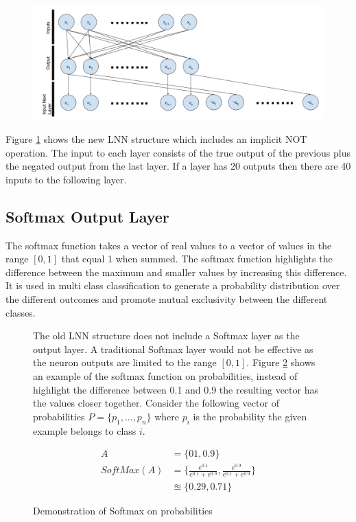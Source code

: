 \begin{figure}[H]
	\centering
	\begin{minipage}[b]{0.9\textwidth}
		\includegraphics[width=\textwidth]{Modified-LNN-Structure.png}
		\caption{}
		\label{fig:modified-lnn-structure}
	\end{minipage}
	\hfill
\end{figure}

Figure \ref{fig:modified-lnn-structure} shows the new LNN structure which includes an implicit NOT operation. The input to each layer consists of the true output of the previous plus the negated output from the last layer. If a layer has 20 outputs then there are 40 inputs to the following layer.
\subsection{Softmax Output Layer}
The softmax function takes a vector of real values to a vector of values in the range $[0,1]$ that equal 1 when summed. The softmax function highlights the difference between the maximum and smaller values by increasing this difference. It is used in multi class classification to generate a probability distribution over the different outcomes and promote mutual exclusivity between the different classes.
\begin{figure}[H]
\begin{minipage}[t]{0.57\textwidth}
	\vspace{0px}
	The old LNN structure does not include a Softmax layer as the output layer. A traditional Softmax layer would not be effective as the neuron outputs are limited to the range $[0,1]$. Figure \ref{fig:softmax-failure} shows an example of the softmax function on probabilities, instead of highlight the difference between 0.1 and 0.9 the resulting vector has the values closer together. Consider the following vector of probabilities $P = \{p_1, ..., p_n\}$ where $p_i$ is the probability the given example belongs to class $i$.
\end{minipage}
\hspace{3px}
\begin{minipage}[t]{0.4\textwidth}
\vspace{0px}
	\begin{align*}
		A &= \{01, 0.9\}\\
		SoftMax(A) &= \{ \frac{e^{0.1}}{e^{0.1} + e^{0.9}}, \frac{e^{0.9}}{e^{0.1} + e^{0.9}} \}\\
		&\approxeq \{ 0.29, 0.71 \}
	\end{align*}
\caption{Demonstration of Softmax on probabilities}
\label{fig:softmax-failure}

\end{minipage}
\end{figure}

